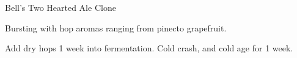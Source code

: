 \stylesection{\styleamericanipa}

\begin{recipe}{Bell's Two Hearted Ale Clone}

\begin{aboutblock}
Bursting with hop aromas ranging from pinecto grapefruit. \sourceaha
\end{aboutblock}


\begin{methodandtiming}
 
\begin{mashsteps}
\end{mashsteps}

\begin{directions}
Add dry hops 1 week into fermentation. Cold crash, and cold age for 1 week.
\end{directions}

\end{methodandtiming}

\recipebreak

\begin{ingredientsblock}

\begin{malts}
\end{malts}

\begin{hops}
\end{hops}


\end{ingredientsblock}

\end{recipe}

